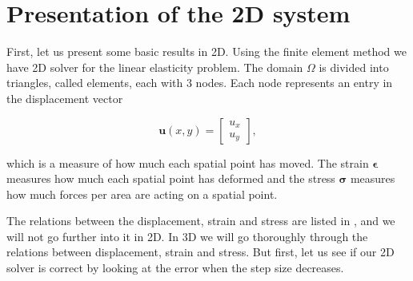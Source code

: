 \section{Presentation of the 2D system}

First, let us present some basic results in 2D. Using the finite element method we have 2D solver for the linear elasticity problem. The domain $\Omega$ is divided into triangles, called elements, each with 3 nodes. Each node represents an entry in the displacement vector

\begin{equation}
\bm{u}(x,y) = 
\begin{bmatrix}
u_x \\
u_y
\end{bmatrix},
\end{equation}

which is a measure of how much each spatial point has moved. The strain $\bm{\epsilon}$ measures how much each spatial point has deformed and the stress $\bm{\sigma}$ measures how much forces per area are acting on a spatial point. 

The relations between the displacement, strain and stress are listed in \cite{note2}, and we will not go further into it in 2D. In 3D we will go thoroughly through the relations between displacement, strain and stress. But first, let us see if our 2D solver is correct by looking at the error when the step size decreases. 



